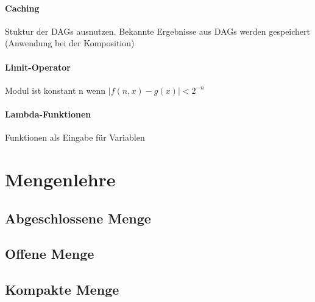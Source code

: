 \documentclass[ngerman]{scrartcl}
\begin{document}
\paragraph{Caching} Stuktur der DAGs ausnutzen. Bekannte Ergebnisse aus DAGs werden gespeichert (Anwendung bei der Komposition)

\paragraph{Limit-Operator} Modul ist konstant n wenn $ |f(n,x) - g(x)| < 2^{-n} $ 

\paragraph{Lambda-Funktionen} Funktionen als Eingabe für Variablen


\section{Mengenlehre}

\subsection{Abgeschlossene Menge}

\subsection{Offene Menge}

\subsection{Kompakte Menge}
\end{document}
